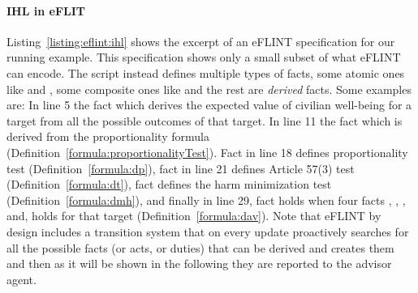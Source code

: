 \paragraph{IHL in eFLIT}
Listing~\ref{listing:eflint:ihl} shows the excerpt of an eFLINT specification for our running example. This specification shows only a small subset of what eFLINT can encode. The script instead defines multiple types of facts, some atomic ones like  and , some composite ones like  and the rest are \textit{derived} facts. Some examples are: In line 5 the fact  which derives the expected value of civilian well-being for a target from all the possible outcomes of that target. In line 11 the fact  which is derived from the proportionality formula (Definition~\ref{formula:proportionalityTest}). Fact  in line 18 defines proportionality test (Definition~\ref{formula:dp}), fact  in line 21 defines Article 57(3) test (Definition~\ref{formula:dt}), fact  defines the harm minimization test (Definition~\ref{formula:dmh}), and finally in line 29, fact  holds when four facts , , , and,  holds for that target (Definition~\ref{formula:dav}). Note that eFLINT by design includes a transition system that on every update proactively searches for all the possible facts (or acts, or duties) that can be derived and creates them and then as it will be shown in the following they are reported to the advisor agent.
%
